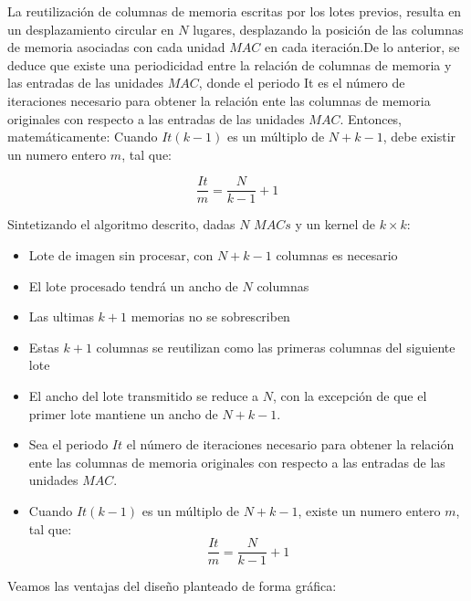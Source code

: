 \documentclass[]{IEEEphot}
\begin{document}
La reutilización de columnas de memoria escritas por los lotes previos, resulta en un desplazamiento circular en $N$ lugares, desplazando la posición de las columnas de memoria asociadas con cada unidad $MAC$ en cada iteración.De lo anterior, se deduce que existe una periodicidad entre la relación de columnas de memoria y las entradas de las unidades $MAC$, donde el periodo It es el número de iteraciones necesario para obtener la relación ente las columnas de memoria originales con respecto a las entradas de las unidades $MAC$.
Entonces, matemáticamente: Cuando $It(k-1)$ es un múltiplo de $N+k-1$, debe existir un numero entero $m$, tal que:

\begin{equation}\label{niter}
  \frac{It}{m} = \frac{N}{k-1} + 1
\end{equation}

Sintetizando el algoritmo descrito, dadas $N$ $MACs$ y  un kernel de $ k \times k$:
\begin{frame}{}
	    
      \begin{itemize}

	\item Lote de imagen sin procesar,  con $N+k-1$ columnas es necesario
	\item El lote procesado tendrá un ancho de $N$ columnas
	\item Las ultimas $k+1$ memorias no se sobrescriben
	\item Estas $k+1$ columnas se reutilizan como las primeras columnas del siguiente lote
	\item El ancho del lote transmitido se reduce a $N$, con la excepción de que el primer lote mantiene un ancho de $N+k-1$.
	\item Sea el periodo $It$  el número de iteraciones necesario para obtener la relación ente las columnas de memoria originales con respecto a las entradas de las unidades $MAC$.
	\item Cuando $It(k-1)$ es un múltiplo de $N+k-1$, existe un numero entero $m$, tal que:
\begin{equation}\label{niter}
  \frac{It}{m} = \frac{N}{k-1} + 1
\end{equation}


\end{itemize}
\end{frame}

\bigskip
\bigskip
\bigskip

Veamos las ventajas del diseño planteado de forma gráfica:
\end{document}
